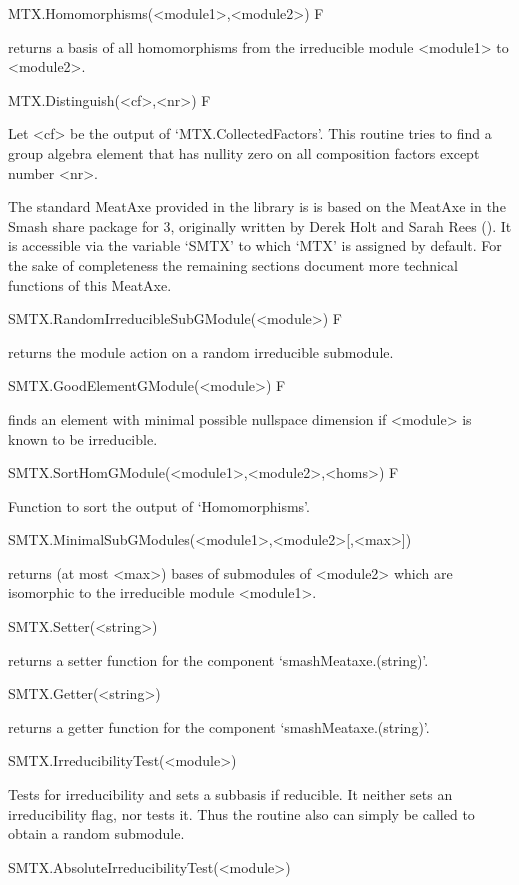\>MTX.Homomorphisms(<module1>,<module2>) F

returns a basis of all homomorphisms from the irreducible module 
<module1> to <module2>.

\>MTX.Distinguish(<cf>,<nr>) F

Let <cf> be the output of `MTX.CollectedFactors'. This routine
tries to find a group algebra element that has nullity zero on all
composition factors except number <nr>.


The standard MeatAxe provided in the {\GAP} library is
is based on the MeatAxe in the {\sf Smash} share
package for {\GAP}3, originally written by Derek Holt and Sarah Rees
(\cite{HR94}). It is
accessible via the variable `SMTX' to which `MTX' is assigned by default. 
For the sake of completeness the remaining sections document more technical
functions of this MeatAxe.

\>SMTX.RandomIrreducibleSubGModule(<module>) F

returns the module action on a random irreducible submodule.

\>SMTX.GoodElementGModule(<module>) F

finds an element with minimal possible nullspace dimension if <module>
is known to be irreducible.

\>SMTX.SortHomGModule(<module1>,<module2>,<homs>) F

Function to sort the output of `Homomorphisms'.

\>SMTX.MinimalSubGModules(<module1>,<module2>[,<max>])

returns (at most <max>) bases of submodules of <module2> which are
isomorphic to the irreducible module  <module1>.

\>SMTX.Setter(<string>)

returns a setter function for the component `smashMeataxe.(string)'.

\>SMTX.Getter(<string>)

returns a getter function for the component `smashMeataxe.(string)'.

\>SMTX.IrreducibilityTest(<module>)

Tests for irreducibility and sets a subbasis if reducible. It neither sets
an irreducibility flag, nor tests it. Thus the routine also can simply be
called to obtain a random submodule.

\>SMTX.AbsoluteIrreducibilityTest(<module>)

